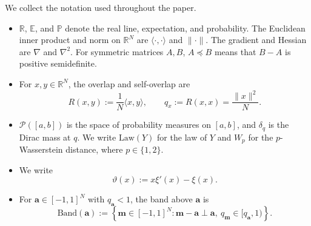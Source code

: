 \documentclass[a4paper,10pt,reqno]{amsart}
\numberwithin{equation}{section}
\newcommand{\dR}{\mathbb{R}}%
\newcommand{\dP}{\mathbb{P}}%
\newcommand{\dE}{\mathbb{E}}%
\newcommand{\Law}{\mathrm{Law}}
\newcommand{\mc}{\mathcal}
\newcommand{\Band}{\mathrm{Band}}
\newcommand{\bfm}{\mathbf{m}}
\newcommand{\bfa}{\mathbf{a}}
\begin{document}
	We collect the notation used throughout the paper.
	\begin{itemize}\itemsep2pt
		\item \(\dR\), \(\dE\), and \(\dP\) denote the real line, expectation,
		and probability. The Euclidean inner product and norm on \(\dR^N\) are
		\(\langle\cdot,\cdot\rangle\) and \(\|\cdot\|\). The gradient and
		Hessian are \(\nabla\) and \(\nabla^2\). For symmetric matrices \(A,B\),
		\(A\preceq B\) means that \(B-A\) is positive semidefinite.
		
		\item For \(x,y\in\dR^N\), the overlap and self-overlap are
		\[
		R(x,y):=\frac1N\langle x,y\rangle,
		\qquad
		q_x:=R(x,x)=\frac{\|x\|^2}{N}.
		\]
		
		\item \(\mc P([a,b])\) is the space of probability measures on
		\([a,b]\), and \(\delta_q\) is the Dirac mass at \(q\). We write
		\(\Law(Y)\) for the law of \(Y\) and \(W_p\) for the
		\(p\)-Wasserstein distance, where \(p\in\{1,2\}\).
	\end{itemize}
	
	\begin{itemize}\itemsep2pt
		\item We write
		\[
		\vartheta(x):=x\xi'(x)-\xi(x).
		\]
		
		\item For \(\bfa\in[-1,1]^N\) with \(q_\bfa<1\), the band above
		\(\bfa\) is
		\[
		\Band(\bfa)
		:=
		\left\{
		\bfm\in[-1,1]^N:
		\bfm-\bfa\perp\bfa,\
		q_\bfm\in[q_\bfa,1)
		\right\}.
		\]
	\end{itemize}
	
\end{document}
